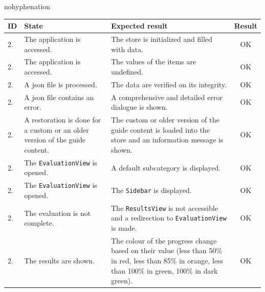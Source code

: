 \begin{hyphenrules}{nohyphenation}
	\begin{table}[ht]
		\begin{center}
			\begin{tabularx}{\textwidth}{l|p{4cm}Xc}
				\toprule[0.8mm]
				\textbf{ID} & \textbf{State} & \textbf{Expected result} & \textbf{Result} \\
				\midrule[0.8mm]
				\stepcounter{testsappcounter}
				2.\thetestsappcounter & The application is accessed. & The store is initialized and filled with data. & \cellcolor{green!25}OK \\
				\midrule 
				\stepcounter{testsappcounter}
				2.\thetestsappcounter & The application is accessed. & The values of the items are undefined. & \cellcolor{green!25}OK \\
				\midrule 
				\stepcounter{testsappcounter}
				2.\thetestsappcounter & A \gls{json} file is processed. & The data are verified on its integrity. & \cellcolor{green!25}OK \\
				\midrule 
				\stepcounter{testsappcounter}
				2.\thetestsappcounter & A \gls{json} file contains an error. & A comprehensive and detailed error dialogue is shown. & \cellcolor{green!25}OK \\
				\midrule 
				\stepcounter{testsappcounter}
				2.\thetestsappcounter & A restoration is done for a custom or an older version of the guide content. & The custom or older version of the guide content is loaded into the store and an information message is shown. & \cellcolor{green!25}OK \\
				\midrule 
				\stepcounter{testsappcounter}
				2.\thetestsappcounter & The \texttt{EvaluationView} is opened. & A default subcategory is displayed. & \cellcolor{green!25}OK \\
				\midrule 
				\stepcounter{testsappcounter}
				2.\thetestsappcounter & The \texttt{EvaluationView} is opened. & The \texttt{Sidebar} is displayed. & \cellcolor{green!25}OK \\
				\midrule 
				\stepcounter{testsappcounter}
				2.\thetestsappcounter & The evaluation is not complete. & The \texttt{ResultsView} is not accessible and a redirection to \texttt{EvaluationView} is made. & \cellcolor{green!25}OK \\
				\midrule 
				\stepcounter{testsappcounter}
				2.\thetestsappcounter & The results are shown. & The colour of the progress change based on their value (less than 50\% in red, less than 85\% in orange, less than 100\% in green, 100\% in dark green). & \cellcolor{green!25}OK \\

\end{tabularx}
\end{center}
\end{table}
\end{hyphenrules}
